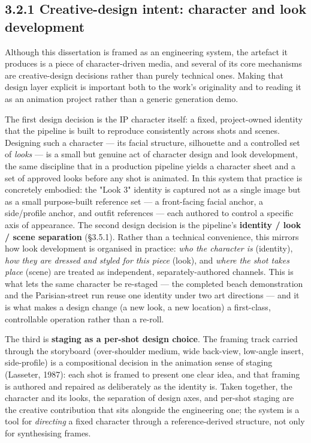 \documentclass[10pt,twocolumn,letterpaper]{article}
\begin{document}

\subsection*{3.2.1 Creative-design intent: character and look development}

Although this dissertation is framed as an engineering system, the artefact it produces is a piece of character-driven media, and several of its core mechanisms are creative-design decisions rather than purely technical ones. Making that design layer explicit is important both to the work's originality and to reading it as an animation project rather than a generic generation demo.

The first design decision is the IP character itself: a fixed, project-owned identity that the pipeline is built to reproduce consistently across shots and scenes. Designing such a character --- its facial structure, silhouette and a controlled set of \emph{looks} --- is a small but genuine act of character design and look development, the same discipline that in a production pipeline yields a character sheet and a set of approved looks before any shot is animated. In this system that practice is concretely embodied: the "Look 3" identity is captured not as a single image but as a small purpose-built reference set --- a front-facing facial anchor, a side/profile anchor, and outfit references --- each authored to control a specific axis of appearance.
The second design decision is the pipeline's \textbf{identity / look / scene separation} (\S{}3.5.1). Rather than a technical convenience, this mirrors how look development is organised in practice: \emph{who the character is} (identity), \emph{how they are dressed and styled for this piece} (look), and \emph{where the shot takes place} (scene) are treated as independent, separately-authored channels. This is what lets the same character be re-staged --- the completed beach demonstration and the Parisian-street run reuse one identity under two art directions --- and it is what makes a design change (a new look, a new location) a first-class, controllable operation rather than a re-roll.

The third is \textbf{staging as a per-shot design choice}. The framing track carried through the storyboard (over-shoulder medium, wide back-view, low-angle insert, side-profile) is a compositional decision in the animation sense of staging (Lasseter, 1987): each shot is framed to present one clear idea, and that framing is authored and repaired as deliberately as the identity is. Taken together, the character and its looks, the separation of design axes, and per-shot staging are the creative contribution that sits alongside the engineering one; the system is a tool for \emph{directing} a fixed character through a reference-derived structure, not only for synthesising frames.
\end{document}
